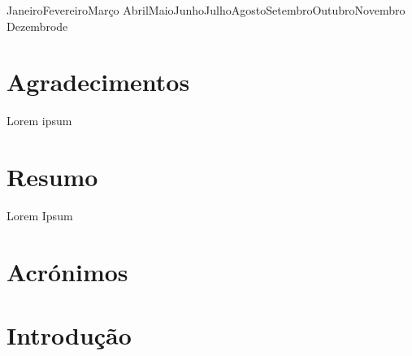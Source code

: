 \documentclass[12pt,a4paper]{memoir}
\renewcommand{\today}{\day \ifcase \month \or Janeiro\or Fevereiro\or Março\or %
Abril\or Maio\or Junho\or Julho\or Agosto\or Setembro\or Outubro\or Novembro\or %
Dezembro\fi de \number \year}
\begin{document}
\vspace{0.5cm}
\begin{center}
\begin{normalsize}
\today
\end{normalsize}
\end{center}

\clearpage{\thispagestyle{empty}\cleardoublepage}

\frontmatter

\acresetall



\chapter*{Agradecimentos}
\label{chap:agradec}

Lorem ipsum

\clearpage{\thispagestyle{empty}\cleardoublepage}



\chapter*{Resumo}
\label{chap:resumo}

Lorem Ipsum

\clearpage{\thispagestyle{empty}\cleardoublepage}
\lstlistoflistings

\clearpage{\thispagestyle{empty}\cleardoublepage}



\chapter*{Acrónimos}
\label{chap:acro}

\begin{acronym}
\end{acronym}

\clearpage{\pagestyle{empty}\cleardoublepage}

\tableofcontents

\clearpage{\thispagestyle{empty}\cleardoublepage}

\mainmatter



\chapter{Introdução}
\label{chap:intro}
\end{document}

